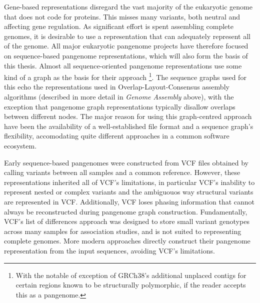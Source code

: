 Gene-based representations disregard the vast majority of the eukaryotic genome that does not code for proteins.
This misses many variants, both neutral and affecting gene regulation.
As significant effort is spent assembling complete genomes, it is desirable to use a representation that can adequately represent all of the genome.
All major eukaryotic pangenome projects have therefore focused on sequence-based pangenome representations, which will also form the basis of this thesis.
Almost all sequence-oriented pangenome representations use some kind of a graph as the basis for their approach
\footnote{With the notable of exception of GRCh38's additional unplaced contigs for certain regions known to be structurally polymorphic, if the reader accepts this as a pangenome.}.
The sequence graphs used for this echo the representations used in Overlap-Layout-Consensus assembly algorithms (described in more detail in \textit{Genome Assembly} above), with the exception that pangenome graph representations typically disallow overlaps between different nodes.
The major reason for using this graph-centred approach have been the availability of a well-established file format and a sequence graph's flexibility, accomodating quite different approaches in a common software ecosystem\cite{paten17, matthews24, gfatools, garrison18}.

Early sequence-based pangenomes were constructed from VCF files obtained by calling variants between all samples and a common reference\cite{garrison18, pangenie}.
However, these representations inherited all of VCF's limitations, in particular
VCF's inability to represent nested or complex variants and the ambiguouos way structural variants are represented in VCF.
Additionally, VCF loses phasing information that cannot always be reconstructed during pangenome graph construction.
Fundamentally, VCF's list of differences approach was designed to store small variant genotypes across many samples for association studies, and is not suited to representing complete genomes.
More modern approaches directly construct their pangenome representation from the input sequences, avoiding VCF's limitations.

